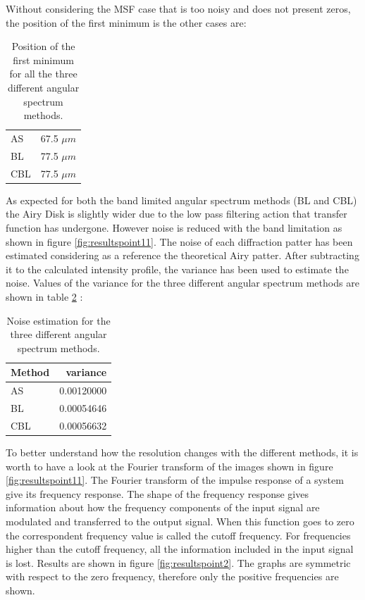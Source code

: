 	 Without considering the MSF case that is too noisy and does not present zeros, the position of the first minimum is the other cases are:\\
	 \begin {table}
	 \begin{center}
	 	\label{tab:minimum}
	 \begin{tabular}{ l | r }
	 	
	 	\hline			
	 	AS & 67.5 $\mu m$ \\
	 	BL & 77.5 $\mu m$ \\
	 	CBL & 77.5 $\mu m$ \\
	 	\hline 
	 		\end{tabular}
	 			\caption{Position of the first minimum for all the three different angular spectrum methods. }
	\end{center}
\end{table}
	As expected for both the band limited angular spectrum methods (BL and CBL) the Airy Disk is slightly wider due to the low pass filtering action that transfer function has undergone.  However noise is reduced with the band limitation as shown in figure
	 \ref{fig:resultspoint11}.
	 The noise of each diffraction patter has been estimated considering as a reference the theoretical Airy patter. After subtracting it to the calculated intensity profile, the variance has been used to estimate the noise. Values of the variance for the three different angular spectrum methods are shown in table \ref{tab:noisemethods} :
	 	 \begin {table}
	 	 \begin{center}
	 	 	\label{tab:noisemethods}
	 	 	\begin{tabular}{ l | r }
	 	 		
	 	 		\hline	
	 	 		Method & variance \\
	 	 		\hline		
	 	 		AS & 0.00120000 \\
	 	 		BL & 0.00054646 \\
	 	 		CBL & 0.00056632 \\
	 	 		\hline 
	 	 	\end{tabular}
	 	 	\caption{Noise estimation for the three different angular spectrum methods. }
	 	 \end{center}
	 	\end{table}
	 To better understand how the resolution changes with the different methods, it is worth to have a look at the Fourier transform of the images shown in figure \ref{fig:resultspoint11}. The Fourier transform of the impulse response of a system give its frequency response. The shape of the frequency response gives information about how the frequency components of the input signal are modulated and transferred to the output signal. When this function goes to zero the correspondent frequency value is called the cutoff frequency. For frequencies higher than the cutoff frequency, all the information included in the input signal is lost. Results are shown in figure \ref{fig:resultspoint2}. The graphs are symmetric with respect to the zero frequency, therefore only the positive frequencies are shown.
	 
